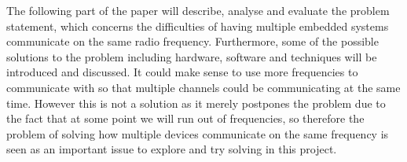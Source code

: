 \newpage
The following part of the paper will describe, analyse and evaluate the problem statement, which concerns the difficulties of having multiple embedded systems communicate on the same radio frequency.
Furthermore, some of the possible solutions to the problem including hardware, software and techniques will be introduced and discussed.
It could make sense to use more frequencies to communicate with so that multiple channels could be communicating at the same time.
However this is not a solution as it merely postpones the problem due to the fact that at some point we will run out of frequencies, so therefore the problem of solving how multiple devices communicate on the same frequency is seen as an important issue to explore and try solving in this project.